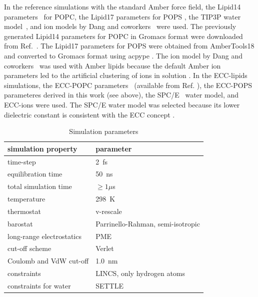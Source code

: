 \documentclass[journal=jpcbfk,manuscript=article]{achemso}
\begin{document}
In the reference simulations with the standard Amber force field,
the Lipid14 parameters~\cite{dickson14} for POPC, the Lipid17 parameters for POPS \cite{lipid17-future},
the TIP3P water model~\cite{jorgensen83}, and ion models by Dang and coworkers~\cite{smith94,chang1999,dang2006} were used.
The previously generated \cite{botan15} Lipid14 parameters for POPC in Gromacs format were downloaded from Ref.~. 
The Lipid17 parameters for POPS were obtained from AmberTools18 \cite{amber18} 
and converted to Gromacs format using acpype \cite{acpype}.  
The ion model by Dang and coworkers~\cite{smith94,chang1999,dang2006} was used with Amber lipids because
the default Amber ion parameters \cite{aqvist90} led to the artificial clustering of ions in solution \cite{NMRlipidsIV}.
In the ECC-lipids simulations,
the ECC-POPC parameters~\cite{melcr18} (available from Ref. ), 
the ECC-POPS parameteres derived in this work (see above), 
the SPC/E~\cite{Berendsen1987} water model, and ECC-ions \cite{martinek17, kohagen16, Pluharova2014} were used.
The SPC/E water model was selected because its lower dielectric constant is consistent with the
ECC concept \cite{leontyev11,leontyev14}.
\begin{table}[tbp]
  \caption{Simulation parameters}
  \label{tbl:mdpar}
  \begin{tabular}{ll}
    simulation property & parameter   \\
    \hline
    time-step           & 2~fs         \\
    equilibration time  & 50~ns  \\
    total simulation time     & $\geq 1 \mu$s  \\
    temperature         & 298~K       \\
    thermostat          & v-rescale  \cite{bussi07}   \\
    barostat            & Parrinello-Rahman, semi-isotropic \cite{parrinello81} \\
    long-range electrostatics & PME  \cite{darden93}  \\
    cut-off scheme      & Verlet \cite{Pall13}      \\
    Coulomb and VdW cut-off & 1.0~nm \\
    constraints         & LINCS, only hydrogen atoms \cite{hess97} \\
    constraints for water & SETTLE  \cite{miyamoto92} \\
    \hline
  \end{tabular}
\end{table}
 
\end{document}
